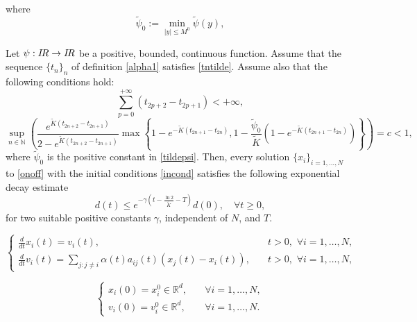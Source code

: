 \documentclass[10pt,a4paper]{amsart}
\newcommand{\RR}{{{\rm I} \kern -.15em {\rm R} }}
\begin{document}
where \begin{equation}\label{tildepsi}
	\tilde{\psi}_{0}:=\min_{\lvert y\rvert\leq M^{0}}\tilde\psi(y),
\end{equation}

\begin{thm}
	Let $\psi:\RR\rightarrow\RR$ be a positive, bounded, continuous function. Assume that the sequence $\{t_{n}\}_{n}$ of definition \eqref{alpha1} satisfies \eqref{tntilde}. Assume also that the following conditions hold:
	\begin{equation}\label{badtilde}
		\sum_{p=0}^{+\infty}(t_{2p+2}-t_{2p+1})<+\infty,
	\end{equation}
	\begin{equation}\label{addcond2}
		\sup_{n\in \mathbb{N}}\left(\frac{e^{\tilde K(t_{2n+2}-t_{2n+1})}}{2-e^{\tilde K(t_{2n+2}-t_{2n+1})}}\max\left\{1-e^{-\tilde K(t_{2n+1}-t_{2n})},1-\frac{\tilde{\psi}_{0}}{\tilde K}(1-e^{-\tilde K(t_{2n+1}-t_{2n})})\right\}\right)=c<1,
	\end{equation}
where $\tilde{\psi}_0$ is the positive constant in \eqref{tildepsi}. Then, every solution $\{x_{i}\}_{i=1,\dots,N}$ to \eqref{onoff} with the initial conditions \eqref{incond} satisfies the following exponential decay estimate
	\begin{equation}\label{expestnb}
		d(t)\leq e^{-\gamma\left(t-\frac{\ln2}{\tilde K}-T\right) }d(0),\quad \forall t\geq 0,
	\end{equation}
	for two suitable positive constants $\gamma$, independent of $N$, and $T$.
\end{thm}

\begin{equation}\label{onoffcs}
	\begin{cases}
		\frac{d}{dt}x_{i}(t)=v_{i}(t),&\quad t>0,	\,\,\forall i=1,\dots,N,\\\frac{d}{dt}v_{i}(t)=\underset{j:j\neq i}{\sum}\alpha(t) a_{ij}(t)(x_{j}(t)-x_{i}(t)),&\quad t>0,	\,\,\forall i=1,\dots,N,
	\end{cases}
\end{equation}

\begin{equation}\label{incondcs}
	\begin{cases}
		x_{i}(0)=x^{0}_{i}\in \mathbb{R}^{d},&\quad \forall i=1,\dots,N,\\v_{i}(0)=v^{0}_{i}\in \mathbb{R}^{d},&\quad \forall i=1,\dots,N.
	\end{cases}		
\end{equation}
\end{document}
